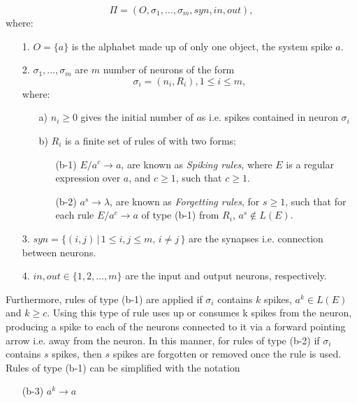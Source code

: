 \documentclass{acm_proc_article-sp}
\begin{document}

\begin{definition} 
$$\Pi=(O,\sigma_1,\ldots, \sigma_m, syn, in, out),$$
where:
\begin{enumerate}
\item[1.] $O=\{a\}$ is the alphabet made up of only one object, the system spike $a$.

\item[2.] $\sigma_1,\ldots, \sigma_m$ are $m$ number of neurons of the form
$$\sigma_{i}=(n_i, R_i),1\leq i\leq m,$$
where:
\begin{enumerate}
\item[a)] $n_i\geq 0$ gives the initial number of $a$s i.e. spikes contained in neuron $\sigma_i$
\item[b)] $R_i$ is a finite set of rules of with two forms:
\begin{enumerate}
\item[(b-1)]$E/a^c \rightarrow a$, are known as \textit{Spiking rules}, where $E$ is a regular expression
over $a$, and $c\geq 1$, such that $c\geq 1$. 
\item[(b-2)]$a^s\rightarrow \lambda$, are known as \textit{Forgetting rules}, for $s\geq 1$, such that for each rule $E/a^c\rightarrow a$ of type (b-1) from $R_i$, $a^s\notin L(E)$. 
\end{enumerate}
\end{enumerate}
\item[3.] $syn= \{ (i,j)\, |\, 1\leq i,j \leq m, \, i\neq j\, \}$ are the synapses i.e. connection between neurons.

\item[4.] $in, out\in \{1,2,\ldots, m\}$ are the input and output neurons, respectively.
\end{enumerate}

\end{definition}

Furthermore, rules of type (b-1) are applied if $\sigma_i$ contains $k$
spikes, $a^k \in L(E)$ and $k \geq c$. Using this type of rule uses up
or consumes k spikes from the neuron, producing a spike to
each of the neurons connected to it via a forward pointing arrow i.e. away from the neuron. In this manner, for rules of type (b-2)
if $\sigma_i$ contains $s$ spikes, then $s$ spikes are forgotten or
removed once the rule is used. Rules of type (b-1) can be
simplified with the notation

\begin{definition}
\begin{enumerate}
\begin{enumerate}
\item[(b-3)]$a^k \rightarrow a$
\end{enumerate}
\end{enumerate}
\end{definition}
\end{document}
